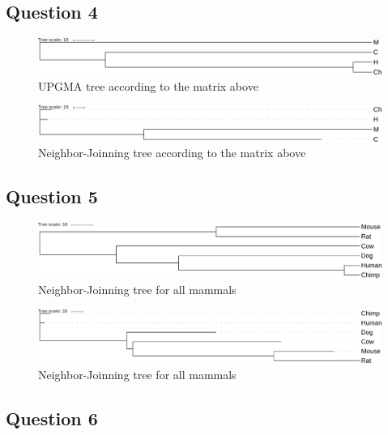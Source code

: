 \documentclass[]{article}
\begin{document}
\subsection{Question 4}

\begin{figure}[h]
	\includegraphics*[width = \linewidth]{../UPGMA1.pdf}
	\caption{\label{upgma1} UPGMA tree according to the matrix above }
\end{figure}

\begin{figure}[h]
	\includegraphics*[width = \linewidth]{../NJ1.pdf}
	\caption{\label{nj1} Neighbor-Joinning tree according to the matrix above }
\end{figure}

\subsection{Question 5}


\begin{figure}[h]
	\includegraphics*[width = \linewidth]{../files/UPGMA.pdf}
	\caption{\label{upgma2} Neighbor-Joinning tree for all mammals }
\end{figure}

\begin{figure}[h]
	\includegraphics*[width = \linewidth]{../files/NJ.pdf}
	\caption{\label{nj2} Neighbor-Joinning tree for all mammals }
\end{figure}

\subsection{Question 6}
\end{document}
